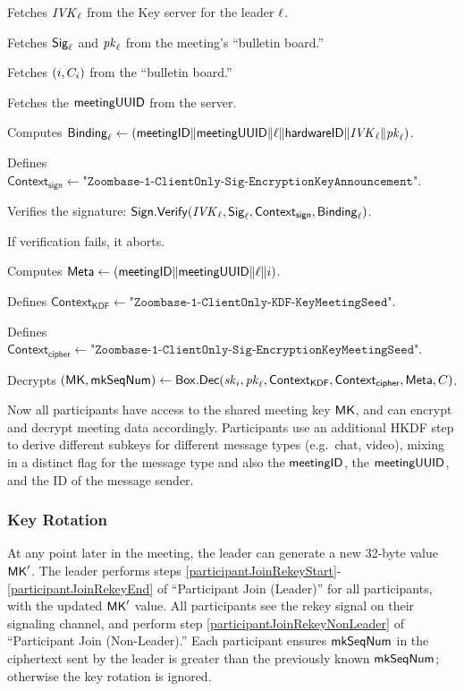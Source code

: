 \begingroup
\RaggedRight
\begin{enumerate*}
\item Fetches $\mathit{IVK}_{\ell}$ from the Key server for the leader $\ell$.
\item Fetches ${\sf Sig}_{\ell}$ and $\mathit{pk}_\ell$ from the meeting's ``bulletin board.''
\item Fetches $(i, C_i)$ from the ``bulletin board.''
\item Fetches the ${\sf meetingUUID}$ from the server.
\item Computes ${\sf Binding}_\ell \leftarrow \left( {\sf meetingID} \| \allowbreak {\sf meetingUUID} \| \ell
\allowbreak \| {\sf hardwareID} \| \mathit{IVK}_\ell \| \allowbreak \mathit{pk}_\ell \right)$.
\item Defines $\textsf{Context}_\textsf{sign} \leftarrow
\texttt{"Zoombase-1-ClientOnly-Sig-EncryptionKeyAnnouncement"}$.
\item Verifies the signature: ${\sf Sign}.\mathsf{Verify}(\mathit{IVK}_{\ell}, {\sf Sig}_\ell, \textsf{Context}_\textsf{sign},
{\sf Binding}_\ell)$.
\item If verification fails, it aborts.
\item Computes ${\sf Meta} \leftarrow \left({\sf meetingID} \| \allowbreak {\sf meetingUUID} \| \allowbreak \ell
\| i \right)$.
\item Defines $\textsf{Context}_\textsf{KDF} \leftarrow
\texttt{"Zoombase-1-ClientOnly-KDF-KeyMeetingSeed"}$.
\item Defines $\textsf{Context}_\textsf{cipher} \leftarrow
\texttt{"Zoombase-1-ClientOnly-Sig-EncryptionKeyMeetingSeed"}$.
\item Decrypts $({\sf MK}, \mathsf{mkSeqNum}) \leftarrow {\sf Box}.\mathsf{Dec}(\mathit{sk}_{i}, \mathit{pk}_{\ell},
\textsf{Context}_\textsf{KDF}, \textsf{Context}_\textsf{cipher}, {\sf Meta}, C)$.
   \label{participantJoinRekeyNonLeader}
\end{enumerate*}
\endgroup

Now all participants have access to the shared meeting key ${\sf MK}$, and can encrypt and decrypt
meeting data accordingly. Participants use an additional HKDF step to derive different subkeys
for different message types (e.g.\ chat, video), mixing in a distinct flag for the message type and
also the ${\sf meetingID}$, the ${\sf meetingUUID}$, and the ID of the message sender.

\subsubsection{Key Rotation}
\label{subsubsec:keyrotation}
At any point later in the meeting, the leader can generate a new 32-byte value ${\sf MK}'$. The leader
performs steps \ref{participantJoinRekeyStart}-\ref{participantJoinRekeyEnd} of ``Participant Join
(Leader)'' for all participants, with the updated ${\sf MK}'$ value. All participants see the rekey
signal on their signaling channel, and perform step \ref{participantJoinRekeyNonLeader} of
``Participant Join (Non-Leader).'' Each participant ensures $\mathsf{mkSeqNum}$ in the ciphertext
sent by the leader is greater than the previously known $\mathsf{mkSeqNum}$; otherwise the key
rotation is ignored.

